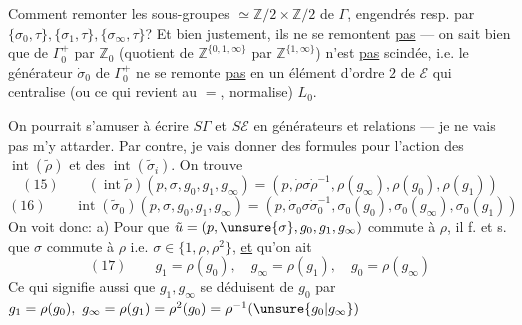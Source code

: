 Comment remonter les sous-groupes  $\simeq\mathbb Z/2\times\mathbb Z/2$ de $\Gamma$, engendrés resp. par $\{\sigma_0,\tau\},\{\sigma_1,\tau\},\{\sigma_\infty,\tau\}$? Et bien justement, ils ne se remontent \uline{pas} --- on sait bien que  de $\Gamma_0^+$  par $\mathbb Z_0$ (quotient de $\mathbb Z^{\{0,1,\infty\}}$ par $\mathbb Z^{\{1,\infty\}}$) n'est \uline{pas} scindée, i.e. le générateur $\dot\sigma_0$ de $\Gamma_0^+$ ne se remonte \uline{pas} en un élément d'ordre $2$ de $\mathcal E$ qui centralise (ou ce qui revient au $=$, normalise) $L_0$.

On pourrait s'amuser à écrire $S\Gamma$ et $S\mathcal E$ en générateurs et relations --- je ne vais pas m'y attarder. Par contre, je vais donner des formules pour l'action des $\operatorname{int}(\tilde\rho)$ et des $\operatorname{int}(\tilde\sigma_i)$. On trouve
\[
(15)\qquad(\operatorname{int}\tilde\rho)(p,\sigma,g_0,g_1,g_\infty)=(p,\dot\rho\sigma\dot\rho^{-1},\rho(g_\infty),\rho(g_0),\rho(g_1))
\]
\[
(16)\qquad\operatorname{int}(\tilde\sigma_0)(p,\sigma,g_0,g_1,g_\infty)=(p,\dot\sigma_0\sigma\dot\sigma_0^{-1},\sigma_0(g_0),\sigma_0(g_\infty),\sigma_0(g_1))
\]
On voit donc: a) Pour que $\tilde u=(p,\unsure{\sigma},g_0,g_1,g_\infty)$ commute à $\rho$, il f. et s. que  $\sigma$ commute à $\rho$ i.e. $\sigma\in\{1,\rho,\rho^2\}$, \uline{et} qu'on ait
\[
(17)\qquad g_1=\rho(g_0),\quad g_\infty=\rho(g_1),\quad g_0=\rho(g_\infty)
\]
Ce qui signifie aussi que $g_1,g_\infty$ se déduisent de $g_0$ par $g_1=\rho(g_0),\ g_\infty=\rho(g_1)=\rho^2(g_0)=\rho^{-1}(\unsure{g_0|g_\infty})$
